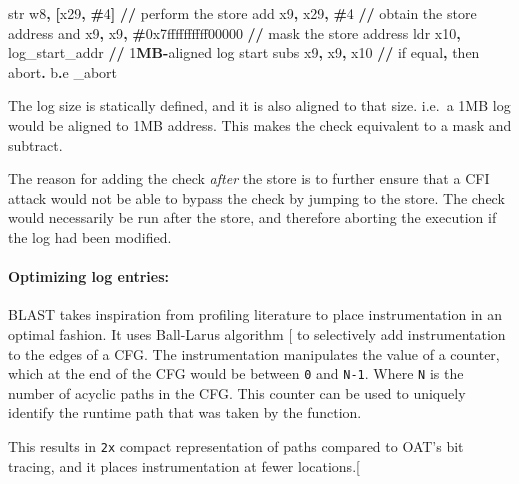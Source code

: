 \documentclass[a4paper, nobind]{templates/ociamthesis}
\newenvironment{Shaded}{\begin{snugshade}}{\end{snugshade}}
\newcommand{\BaseNTok}[1]{\textcolor[rgb]{0.00,0.00,0.81}{#1}}
\newcommand{\BuiltInTok}[1]{#1}
\newcommand{\DecValTok}[1]{\textcolor[rgb]{0.00,0.00,0.81}{#1}}
\newcommand{\ErrorTok}[1]{\textcolor[rgb]{0.64,0.00,0.00}{\textbf{#1}}}
\newcommand{\NormalTok}[1]{#1}
\newcommand{\OperatorTok}[1]{\textcolor[rgb]{0.81,0.36,0.00}{\textbf{#1}}}
\renewenvironment{Shaded}
{
  \vspace{10pt}%
  \begin{snugshade}%
}{%
  \end{snugshade}%
  \vspace{8pt}%
}
\begin{document}
\begin{Shaded}
\begin{Highlighting}[]
\BuiltInTok{str}\NormalTok{ w8}\OperatorTok{,} \OperatorTok{[}\NormalTok{x29}\OperatorTok{,} \OperatorTok{\#}\DecValTok{4}\OperatorTok{]}                 \OperatorTok{//}\NormalTok{ perform the store}
\BuiltInTok{add}\NormalTok{ x9}\OperatorTok{,}\NormalTok{ x29}\OperatorTok{,} \OperatorTok{\#}\DecValTok{4}                   \OperatorTok{//}\NormalTok{ obtain the store address}
\BuiltInTok{and}\NormalTok{ x9}\OperatorTok{,}\NormalTok{ x9}\OperatorTok{,} \OperatorTok{\#}\BaseNTok{0x7ffffffffff00000}   \OperatorTok{//}\NormalTok{ mask the store address}
\NormalTok{ldr x10}\OperatorTok{,}\NormalTok{ log\_start\_addr           }\OperatorTok{//} \DecValTok{1}\ErrorTok{MB}\OperatorTok{{-}}\NormalTok{aligned log start}
\NormalTok{subs x9}\OperatorTok{,}\NormalTok{ x9}\OperatorTok{,}\NormalTok{ x10                  }\OperatorTok{//}\NormalTok{ if equal}\OperatorTok{,}\NormalTok{ then abort}\OperatorTok{.}
\NormalTok{b}\OperatorTok{.}\NormalTok{e \_abort}
\end{Highlighting}
\end{Shaded}

The log size is statically defined, and it is also aligned to that size.
i.e.~a 1MB log would be aligned to 1MB address. This makes the check equivalent
to a mask and subtract.

The reason for adding the check \emph{after} the store is to further ensure that a
CFI attack would not be able to bypass the check by jumping to the store.
The check would necessarily be run after the store, and therefore aborting the
execution if the log had been modified.

\paragraph{Optimizing log entries:}\label{optimizing-log-entries}

BLAST takes inspiration from profiling literature to place instrumentation in
an optimal fashion. It uses Ball-Larus algorithm {[}\citeproc{ref-balllarus}{4}{]} to selectively
add instrumentation to the edges of a CFG. The instrumentation manipulates the value of a counter,
which at the end of the CFG would be between \texttt{0} and \texttt{N-1}. Where \texttt{N} is the number
of acyclic paths in the CFG. This counter can be used to uniquely identify the
runtime path that was taken by the function.

This results in \texttt{2x} compact representation of paths compared to OAT's bit tracing,
and it places instrumentation at fewer locations.{[}\citeproc{ref-blast}{14}{]}
\end{document}
